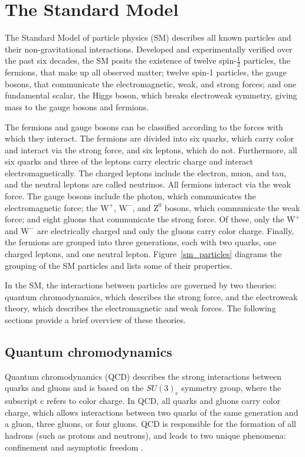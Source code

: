 \section{The Standard Model}
The Standard Model of particle physics (SM) describes all known particles and their non-gravitational interactions. Developed and experimentally verified over the past six decades, the SM posits the existence of twelve spin-$\frac{1}{2}$ particles, the fermions, that make up all observed matter; twelve spin-1 particles, the gauge bosons, that communicate the electromagnetic, weak, and strong forces; and one fundamental scalar, the Higgs boson, which breaks electroweak symmetry, giving mass to the gauge bosons and fermions.

The fermions and gauge bosons can be classified according to the forces with which they interact. The fermions are divided into six quarks, which carry color and interact via the strong force, and six leptons, which do not. Furthermore, all six quarks and three of the leptons carry electric charge and interact electromagnetically. The charged leptons include the electron, muon, and tau, and the neutral leptons are called neutrinos. All fermions interact via the weak force. The gauge bosons include the photon, which communicates the electromagnetic force; the $\mathrm{W}^+$, $\mathrm{W}^-$, and $\mathrm{Z^0}$ bosons, which communicate the weak force; and eight gluons that communicate the strong force. Of these, only the $\mathrm{W}^+$ and $\mathrm{W}^-$ are electrically charged and only the gluons carry color charge. Finally, the fermions are grouped into three generations, each with two quarks, one charged leptons, and one neutral lepton. Figure~\ref{sm_particles} diagrams the grouping of the SM particles and lists some of their properties.



In the SM, the interactions between particles are governed by two theories: quantum chromodynamics, which describes the strong force, and the electroweak theory, which describes the electromagnetic and weak forces. The following sections provide a brief overview of these theories.

\subsection{Quantum chromodynamics}
Quantum chromodynamics (QCD) describes the strong interactions between \linebreak[4]quarks and gluons and is based on the $SU(3)_{c}$ symmetry group, where the subscript c refers to color charge. In QCD, all quarks and gluons carry color charge, which allows interactions between two quarks of the same generation and a gluon, three gluons, or four gluons. QCD is responsible for the formation of all hadrons (such as protons and neutrons), and leads to two unique phenomena: confinement and asymptotic freedom \cite{gross_wilczek_73, qcd_73}. 

